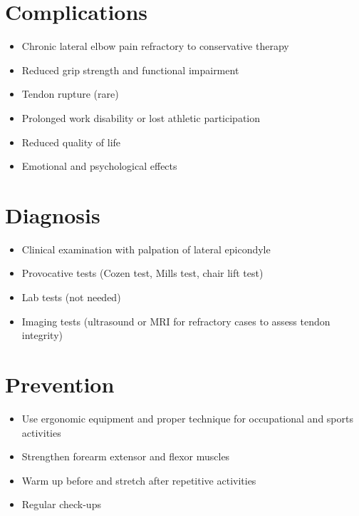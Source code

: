 \section{Complications}
\begin{itemize}[noitemsep]
  \item Chronic lateral elbow pain refractory to conservative therapy
  \item Reduced grip strength and functional impairment
  \item Tendon rupture (rare)
  \item Prolonged work disability or lost athletic participation
  \item Reduced quality of life
  \item Emotional and psychological effects
\end{itemize}

\section{Diagnosis}
\begin{itemize}[noitemsep]
  \item Clinical examination with palpation of lateral epicondyle
  \item Provocative tests (Cozen test, Mills test, chair lift test)
  \item Lab tests (not needed)
  \item Imaging tests (ultrasound or MRI for refractory cases to assess tendon integrity)
\end{itemize}

\section{Prevention}
\begin{itemize}[noitemsep]
  \item Use ergonomic equipment and proper technique for occupational and sports activities
  \item Strengthen forearm extensor and flexor muscles
  \item Warm up before and stretch after repetitive activities
  \item Regular check-ups
\end{itemize}

